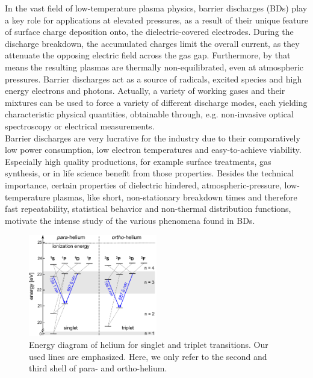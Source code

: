 \documentclass[a4paper,10pt,twoside]{article}
\begin{document}
		In the vast field of low-temperature plasma physics, barrier discharges (BDs) play a key role for applications at elevated pressures, as a result of their unique feature of surface charge deposition onto, the dielectric-covered electrodes. During the discharge breakdown, the accumulated charges limit the overall current, as they attenuate the opposing electric field across the gas gap. Furthermore, by that means the resulting plasmas are thermally non-equilibrated, even at atmospheric pressures. Barrier discharges act as a source of radicals, excited species and high energy electrons and photons. Actually, a variety of working gases and their mixtures can be used to force a variety of different discharge modes, each yielding characteristic physical quantities, obtainable through, e.g. non-invasive optical spectroscopy or electrical measurements.\\
		Barrier discharges are very lucrative for the industry due to their comparatively low power consumption, low electron temperatures and easy-to-achieve viability. Especially high quality productions, for example surface treatments, gas synthesis, or in life science benefit from those properties. Besides the technical importance, certain properties of dielectric hindered, atmospheric-pressure, low-temperature plasmas, like short, non-stationary breakdown times and therefore fast repeatability, statistical behavior and non-thermal distribution functions, motivate the intense study of the various phenomena found in BDs.
		
				
			\begin{figure}[b!]
				\centering
				\hspace{-0.5cm}\includegraphics[width=0.5\textwidth]{figures/setup/He_energy_diagram.pdf}
				\caption{Energy diagram of helium for singlet and triplet transitions. Our used lines are emphasized. Here, we only refer to the second and third shell of para- and ortho-helium.}
				\label{img:termnschema}
			\end{figure}
				
\end{document}
